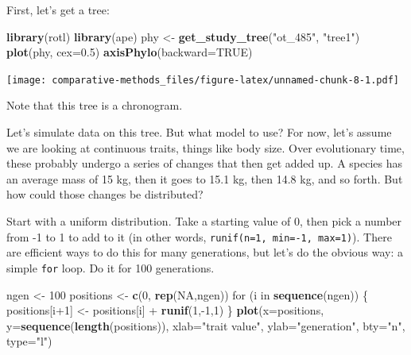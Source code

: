 \documentclass[]{book}
\newenvironment{Shaded}{\begin{snugshade}}{\end{snugshade}}
\newcommand{\KeywordTok}[1]{\textcolor[rgb]{0.13,0.29,0.53}{\textbf{{#1}}}}
\newcommand{\DataTypeTok}[1]{\textcolor[rgb]{0.13,0.29,0.53}{{#1}}}
\newcommand{\DecValTok}[1]{\textcolor[rgb]{0.00,0.00,0.81}{{#1}}}
\newcommand{\FloatTok}[1]{\textcolor[rgb]{0.00,0.00,0.81}{{#1}}}
\newcommand{\StringTok}[1]{\textcolor[rgb]{0.31,0.60,0.02}{{#1}}}
\newcommand{\OtherTok}[1]{\textcolor[rgb]{0.56,0.35,0.01}{{#1}}}
\newcommand{\NormalTok}[1]{{#1}}
\theoremstyle{definition}
\theoremstyle{definition}
\theoremstyle{remark}
\begin{document}
First, let's get a tree:

\begin{Shaded}
\begin{Highlighting}[]
\KeywordTok{library}\NormalTok{(rotl)}
\KeywordTok{library}\NormalTok{(ape)}
\NormalTok{phy <-}\StringTok{ }\KeywordTok{get_study_tree}\NormalTok{(}\StringTok{"ot_485"}\NormalTok{, }\StringTok{"tree1"}\NormalTok{)}
\KeywordTok{plot}\NormalTok{(phy, }\DataTypeTok{cex=}\FloatTok{0.5}\NormalTok{)}
\KeywordTok{axisPhylo}\NormalTok{(}\DataTypeTok{backward=}\OtherTok{TRUE}\NormalTok{)}
\end{Highlighting}
\end{Shaded}

\texttt{[image: comparative-methods\_files/figure-latex/unnamed-chunk-8-1.pdf]}

Note that this tree is a chronogram.

Let's simulate data on this tree. But what model to use? For now, let's
assume we are looking at continuous traits, things like body size. Over
evolutionary time, these probably undergo a series of changes that then
get added up. A species has an average mass of 15 kg, then it goes to
15.1 kg, then 14.8 kg, and so forth. But how could those changes be
distributed?

Start with a uniform distribution. Take a starting value of 0, then pick
a number from -1 to 1 to add to it (in other words,
\texttt{runif(n=1,\ min=-1,\ max=1)}). There are efficient ways to do
this for many generations, but let's do the obvious way: a simple
\texttt{for} loop. Do it for 100 generations.

\begin{Shaded}
\begin{Highlighting}[]
\NormalTok{ngen <-}\StringTok{ }\DecValTok{100}
\NormalTok{positions <-}\StringTok{ }\KeywordTok{c}\NormalTok{(}\DecValTok{0}\NormalTok{, }\KeywordTok{rep}\NormalTok{(}\OtherTok{NA}\NormalTok{,ngen))}
\NormalTok{for (i in }\KeywordTok{sequence}\NormalTok{(ngen)) \{}
  \NormalTok{positions[i}\DecValTok{+1}\NormalTok{] <-}\StringTok{ }\NormalTok{positions[i] +}\StringTok{ }\KeywordTok{runif}\NormalTok{(}\DecValTok{1}\NormalTok{,-}\DecValTok{1}\NormalTok{,}\DecValTok{1}\NormalTok{)}
\NormalTok{\}}
\KeywordTok{plot}\NormalTok{(}\DataTypeTok{x=}\NormalTok{positions, }\DataTypeTok{y=}\KeywordTok{sequence}\NormalTok{(}\KeywordTok{length}\NormalTok{(positions)), }\DataTypeTok{xlab=}\StringTok{"trait value"}\NormalTok{, }\DataTypeTok{ylab=}\StringTok{"generation"}\NormalTok{, }\DataTypeTok{bty=}\StringTok{"n"}\NormalTok{, }\DataTypeTok{type=}\StringTok{"l"}\NormalTok{)}
\end{Highlighting}
\end{Shaded}
\end{document}
